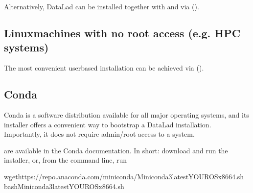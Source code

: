 \sphinxAtStartPar
Alternatively, DataLad can be installed together with {\hyperref[\detokenize{glossary:term-Git}]{}} and
{\hyperref[\detokenize{glossary:term-git-annex}]{}} via {\hyperref[\detokenize{intro/installation:conda}]{}} ().

\ignorespaces 

\subsection{Linux\sphinxhyphen{}machines with no root access (e.g. HPC systems)}
\label{\detokenize{intro/installation:linux-machines-with-no-root-access-e-g-hpc-systems}}\label{\detokenize{intro/installation:norootinstall}}\label{\detokenize{intro/installation:index-11}}
\sphinxAtStartPar
The most convenient user\sphinxhyphen{}based installation can be achieved via {\hyperref[\detokenize{intro/installation:conda}]{}} ().

\ignorespaces 

\subsection{Conda}
\label{\detokenize{intro/installation:conda}}\label{\detokenize{intro/installation:index-12}}\label{\detokenize{intro/installation:id1}}
\sphinxAtStartPar
Conda is a software distribution available for all major operating systems, and
its  installer
offers a convenient way to bootstrap a DataLad installation. Importantly, it
does not require admin/root access to a system.

\sphinxAtStartPar
{} are available
in the Conda documentation. In short: download and run the installer, or, from
the command line, run

\begin{sphinxVerbatim}[commandchars=\\\{\}]
wgethttps://repo.anaconda.com/miniconda/Miniconda3\PYGZhy{}latest\PYGZhy{}\PYGZlt{}YOUR\PYGZhy{}OS\PYGZgt{}\PYGZhy{}x86\PYGZus{}64.sh
bashMiniconda3\PYGZhy{}latest\PYGZhy{}\PYGZlt{}YOUR\PYGZhy{}OS\PYGZgt{}\PYGZhy{}x86\PYGZus{}64.sh
\end{sphinxVerbatim}

